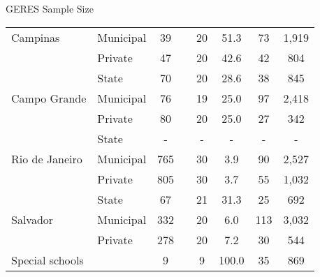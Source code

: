 \documentclass{beamer}
\begin{document}
\begin{frame}[label=GERESSample]{GERES Sample Size}
\begin{table}[H]
\begin{adjustbox}{max width=\textwidth}
\begin{tabular}{llllllll}
    Campinas & Municipal & \multicolumn{1}{c}{39 } &       & \multicolumn{1}{c}{20 } & \multicolumn{1}{c}{51.3} & \multicolumn{1}{c}{73 } & \multicolumn{1}{c}{1,919 } \\
          & Private & \multicolumn{1}{c}{47 } &       & \multicolumn{1}{c}{20 } & \multicolumn{1}{c}{42.6} & \multicolumn{1}{c}{42 } & \multicolumn{1}{c}{804 } \vspace{-3pt} \\
    \midrule
          & State & \multicolumn{1}{c}{70 } &       & \multicolumn{1}{c}{20 } & \multicolumn{1}{c}{28.6} & \multicolumn{1}{c}{38 } & \multicolumn{1}{c}{845 } \\
    Campo Grande & Municipal & \multicolumn{1}{c}{76 } &       & \multicolumn{1}{c}{19 } & \multicolumn{1}{c}{25.0} & \multicolumn{1}{c}{97 } & \multicolumn{1}{c}{2,418 } \\
          & Private & \multicolumn{1}{c}{80 } &       & \multicolumn{1}{c}{20 } & \multicolumn{1}{c}{25.0} & \multicolumn{1}{c}{27 } & \multicolumn{1}{c}{342 } \vspace{-3pt} \\
    \midrule
          & State & \multicolumn{1}{c}{-} &       & \multicolumn{1}{c}{-} & \multicolumn{1}{c}{-} & \multicolumn{1}{c}{-} & \multicolumn{1}{c}{-} \\
    Rio de Janeiro & Municipal & \multicolumn{1}{c}{765 } &       & \multicolumn{1}{c}{30 } & \multicolumn{1}{c}{3.9} & \multicolumn{1}{c}{90 } & \multicolumn{1}{c}{2,527 } \\
          & Private & \multicolumn{1}{c}{805 } &       & \multicolumn{1}{c}{30 } & \multicolumn{1}{c}{3.7} & \multicolumn{1}{c}{55 } & \multicolumn{1}{c}{1,032 } \vspace{-3pt} \\
    \midrule
          & State & \multicolumn{1}{c}{67 } &       & \multicolumn{1}{c}{21 } & \multicolumn{1}{c}{31.3} & \multicolumn{1}{c}{25 } & \multicolumn{1}{c}{692 } \\
    Salvador & Municipal & \multicolumn{1}{c}{332 } &       & \multicolumn{1}{c}{20 } & \multicolumn{1}{c}{6.0} & \multicolumn{1}{c}{113 } & \multicolumn{1}{c}{3,032 } \\
          & Private & \multicolumn{1}{c}{278} &       & \multicolumn{1}{c}{20 } & \multicolumn{1}{c}{7.2} & \multicolumn{1}{c}{30 } & \multicolumn{1}{c}{544 } \vspace{-3pt} \\
    \midrule
    \multicolumn{2}{p{12.5em}}{Special schools} & \multicolumn{1}{c}{9 } &       & \multicolumn{1}{c}{9 } & \multicolumn{1}{c}{100.0} & \multicolumn{1}{c}{35 } & \multicolumn{1}{c}{869 } \vspace{-3pt} \\

\end{tabular}
\end{adjustbox}
\end{table}
\end{frame}
\end{document}
